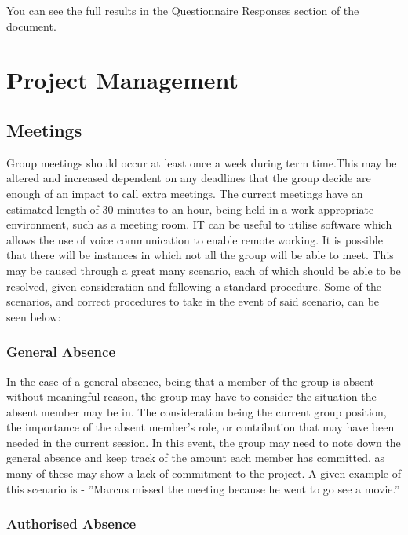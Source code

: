 \documentclass[
  english,
  a4paper,
,tablecaptionabove
]{scrartcl}
\begin{document}
You can see the full results in the
\protect\hyperlink{questionnaire-responses}{Questionnaire Responses}
section of the document.

\hypertarget{project-management}{%
\section{Project Management}\label{project-management}}

\hypertarget{meetings}{%
\subsection{Meetings}\label{meetings}}

Group meetings should occur at least once a week during term time.This
may be altered and increased dependent on any deadlines that the group
decide are enough of an impact to call extra meetings. The current
meetings have an estimated length of 30 minutes to an hour, being held
in a work-appropriate environment, such as a meeting room. IT can be
useful to utilise software which allows the use of voice communication
to enable remote working. It is possible that there will be instances in
which not all the group will be able to meet. This may be caused through
a great many scenario, each of which should be able to be resolved,
given consideration and following a standard procedure. Some of the
scenarios, and correct procedures to take in the event of said scenario,
can be seen below:

\hypertarget{general-absence}{%
\subsubsection{General Absence}\label{general-absence}}

In the case of a general absence, being that a member of the group is
absent without meaningful reason, the group may have to consider the
situation the absent member may be in. The consideration being the
current group position, the importance of the absent member's role, or
contribution that may have been needed in the current session. In this
event, the group may need to note down the general absence and keep
track of the amount each member has committed, as many of these may show
a lack of commitment to the project. A given example of this scenario is
- ''Marcus missed the meeting because he went to go see a movie.''

\hypertarget{authorised-absence}{%
\subsubsection{Authorised Absence}\label{authorised-absence}}
\end{document}

